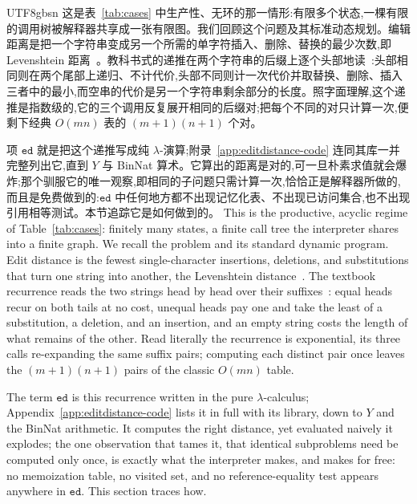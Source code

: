 \begin{CJK*}{UTF8}{gbsn}
  \ifTablambdaChinese
  这是表~\ref{tab:cases} 中生产性、无环的那一情形:有限多个状态,一棵有限的调用树被解释器共享成一张有限图。我们回顾这个问题及其标准动态规划。编辑距离是把一个字符串变成另一个所需的单字符插入、删除、替换的最少次数,即 Levenshtein 距离~\cite{levenshtein1966-binary-codes}。教科书式的递推在两个字符串的后缀上逐个头部地读~\cite{wagner1974-string-correction}:头部相同则在两个尾部上递归、不计代价,头部不同则计一次代价并取替换、删除、插入三者中的最小,而空串的代价是另一个字符串剩余部分的长度。照字面理解,这个递推是指数级的,它的三个调用反复展开相同的后缀对;把每个不同的对只计算一次,便剩下经典 $O(mn)$ 表的 $(m{+}1)(n{+}1)$ 个对。

  项 $\mathtt{ed}$ 就是把这个递推写成纯 $\lambda$-演算;附录~\ref{app:editdistance-code} 连同其库一并完整列出它,直到 $Y$ 与 BinNat 算术。它算出的距离是对的,可一旦朴素求值就会爆炸;那个驯服它的唯一观察,即相同的子问题只需计算一次,恰恰正是解释器所做的,而且是免费做到的:$\mathtt{ed}$ 中任何地方都不出现记忆化表、不出现已访问集合,也不出现引用相等测试。本节追踪它是如何做到的。
  \else
  This is the productive, acyclic regime of Table~\ref{tab:cases}: finitely many states, a finite call tree the interpreter shares into a finite graph. We recall the problem and its standard dynamic program. Edit distance is the fewest single-character insertions, deletions, and substitutions that turn one string into another, the Levenshtein distance~\cite{levenshtein1966-binary-codes}. The textbook recurrence reads the two strings head by head over their suffixes~\cite{wagner1974-string-correction}: equal heads recur on both tails at no cost, unequal heads pay one and take the least of a substitution, a deletion, and an insertion, and an empty string costs the length of what remains of the other. Read literally the recurrence is exponential, its three calls re-expanding the same suffix pairs; computing each distinct pair once leaves the $(m{+}1)(n{+}1)$ pairs of the classic $O(mn)$ table.

  The term $\mathtt{ed}$ is this recurrence written in the pure $\lambda$-calculus; Appendix~\ref{app:editdistance-code} lists it in full with its library, down to $Y$ and the BinNat arithmetic. It computes the right distance, yet evaluated naively it explodes; the one observation that tames it, that identical subproblems need be computed only once, is exactly what the interpreter makes, and makes for free: no memoization table, no visited set, and no reference-equality test appears anywhere in $\mathtt{ed}$. This section traces how.
  \fi


\end{CJK*}
